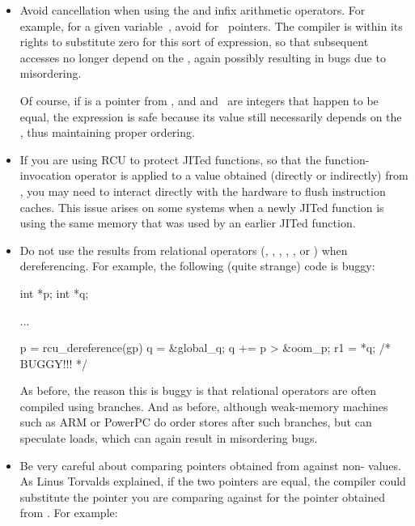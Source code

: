 \begin{itemize}
\item	Avoid cancellation when using the \qco{+} and \qtco{-} infix arithmetic
	operators.
	For example, for a given variable~, avoid
	 for ~pointers.
	The compiler is within its
	rights to substitute zero for this sort of expression, so that
	subsequent accesses no longer depend on the ,
	again possibly resulting in bugs due to misordering.

	Of course, if  is a pointer from , and 
	and~ are integers that happen to be equal, the expression
	 is safe because its value still necessarily depends on
	the , thus maintaining proper ordering.

\item	If you are using RCU to protect JITed functions, so that the
	\qco{()} function-invocation operator is applied to a value obtained
	(directly or indirectly) from , you may need to
	interact directly with the hardware to flush instruction caches.
	This issue arises on some systems when a newly JITed function is
	using the same memory that was used by an earlier JITed function.

\item	Do not use the results from relational operators (\qco{==}, \qco{!=},
	\qco{>}, \qco{>=}, \qco{<}, or \qco{<=}) when dereferencing.
	For example,
	the following (quite strange) code is buggy:

\begin{VerbatimU}
		int *p;
		int *q;

		...

		p = rcu_dereference(gp)
		q = &global_q;
		q += p > &oom_p;
		r1 = *q;  /* BUGGY!!! */
\end{VerbatimU}

	As before, the reason this is buggy is that relational operators
	are often compiled using branches.
	And as before, although
	weak-memory machines such as ARM or PowerPC do order stores
	after such branches, but can speculate loads, which can again
	result in misordering bugs.

\item	Be very careful about comparing pointers obtained from
	 against non- values.
	As Linus Torvalds
	explained, if the two pointers are equal, the compiler could
	substitute the pointer you are comparing against for the pointer
	obtained from .
        For example:


\end{itemize}
